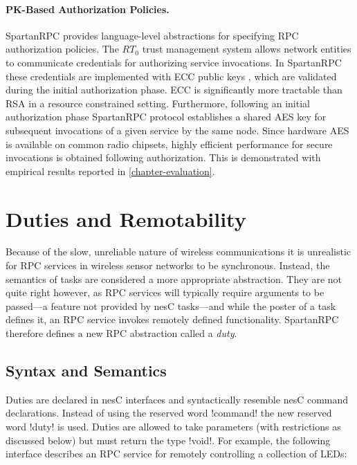 \paragraph{PK-Based Authorization Policies.} SpartanRPC provides language-level abstractions for
specifying RPC authorization policies. The $RT_0$ trust management system allows network
entities to communicate credentials for authorizing service invocations. In SpartanRPC these
credentials are implemented with ECC public keys \cite{bertoni-2006}, which are validated during
the initial authorization phase. ECC is significantly more tractable than RSA in a resource
constrained setting. Furthermore, following an initial authorization phase SpartanRPC protocol
establishes a shared AES key for subsequent invocations of a given service by the same node.
Since hardware AES is available on common radio chipsets, highly efficient performance for
secure invocations is obtained following authorization. This is demonstrated with empirical
results reported in \autoref{chapter-evaluation}.

\section{Duties and Remotability}
\label{section-duties}

Because of the slow, unreliable nature of wireless communications it is unrealistic for RPC
services in wireless sensor networks to be synchronous. Instead, the semantics of tasks are
considered a more appropriate abstraction. They are not quite right however, as RPC services
will typically require arguments to be passed---a feature not provided by nesC tasks---and while
the poster of a task defines it, an RPC service invokes remotely defined functionality.
SpartanRPC therefore defines a new RPC abstraction called a \emph{duty}.

\subsection{Syntax and Semantics}
\label{section-duties-syntax}

Duties are declared in nesC interfaces and syntactically resemble nesC command declarations.
Instead of using the reserved word !command! the new reserved word !duty! is used. Duties are
allowed to take parameters (with restrictions as discussed below) but must return the type
!void!. For example, the following interface describes an RPC service for remotely controlling a
collection of LEDs:

